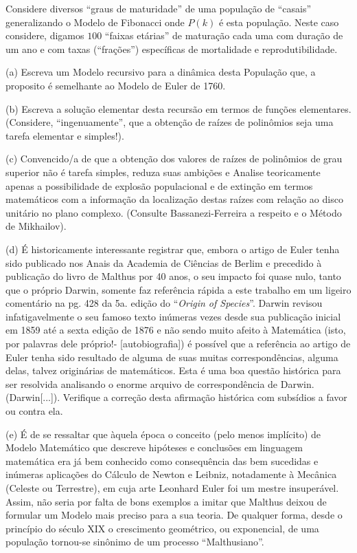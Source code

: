     \begin{exercise}
    Considere diversos ``graus de maturidade'' de uma população de ``casais'' generalizando o Modelo de Fibonacci onde \(P(k)\) é esta população. Neste caso considere, digamos \(100\) ``faixas etárias'' de maturação cada uma com duração de um ano e com taxas (``frações'') específicas de mortalidade e reprodutibilidade.
    
    \item (a) Escreva um Modelo recursivo para a dinâmica desta População que, a proposito é semelhante ao Modelo de Euler de 1760.
    \item (b) Escreva a solução elementar desta recursão em termos de funções elementares.(Considere, ``ingenuamente'', que a obtenção de raízes de polinômios seja uma tarefa elementar e simples!).
    \item (c) Convencido/a de que a obtenção dos valores de raízes de polinômios de grau superior não é tarefa simples, reduza suas ambições e Analise teoricamente apenas a possibilidade de explosão populacional e de extinção em termos matemáticos com a informação da localização destas raízes com relação ao disco unitário no plano complexo. (Consulte Bassanezi-Ferreira a respeito e o Método de Mikhailov).
    \item (d) É historicamente interessante registrar que, embora o artigo de Euler tenha sido publicado nos Anais da Academia de Ciências de Berlim e precedido à publicação do livro de Malthus por 40 anos, o seu impacto foi quase nulo, tanto que o próprio Darwin, somente faz referência rápida a este trabalho em um ligeiro comentário na pg. 428 da 5a. edição do ``\textit{Origin of Species}''. Darwin revisou infatigavelmente o seu famoso texto inúmeras vezes desde sua publicação inicial em 1859 até a sexta edição de 1876 e não sendo muito afeito à Matemática (isto, por palavras dele próprio!- [autobiografia]) é possível que a referência ao artigo de Euler tenha sido resultado de alguma de suas muitas correspondências, alguma delas, talvez originárias de matemáticos. Esta é uma boa questão histórica para ser resolvida analisando o enorme arquivo de correspondência de Darwin. (Darwin[...]). Verifique a correção desta afirmação histórica com subsídios a favor ou contra ela.
    \item (e) É de se ressaltar que àquela época o conceito (pelo menos implícito) de Modelo Matemático que descreve hipóteses e conclusões em linguagem matemática era já bem conhecido como consequência das bem sucedidas e inúmeras aplicações do Cálculo de Newton e Leibniz, notadamente à Mecânica (Celeste ou Terrestre), em cuja arte Leonhard Euler foi um mestre insuperável. Assim, não seria por falta de bons exemplos a imitar que Malthus deixou de formular um Modelo mais preciso para a sua teoria. De qualquer forma, desde o princípio do século XIX o crescimento geométrico, ou exponencial, de uma população tornou-se sinônimo de um processo ``Malthusiano''.
    \end{exercise}

